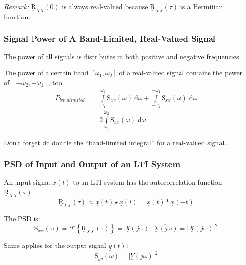 \begin{refsection}
\textit{Remark:} $\underline{\mathrm{R}}_{XX}(0)$ is always real-valued because $\underline{\mathrm{R}}_{XX}(\tau)$ is a Hermitian function.

\subsubsection{Signal Power of A Band-Limited, Real-Valued Signal}

The power of all signals is distributes in both positive and negative frequencies.

The power of a certain band $[\omega_1, \omega_2]$ of a real-valued signal contains the power of $[-\omega_2, -\omega_1]$, too.
\begin{equation}
	\begin{split}
		P_{bandlimited} &= \int\limits_{\omega_1}^{\omega_2} \mathrm{S}_{xx}(\omega) \; \mathrm{d} \omega + \int\limits_{-\omega_2}^{-\omega_1} \mathrm{S}_{xx}(\omega) \; \mathrm{d} \omega \\
		 &= 2 \int\limits_{\omega_1}^{\omega_2} \mathrm{S}_{xx}(\omega) \; \mathrm{d} \omega
	\end{split}
\end{equation}

\begin{attention}
	Don't forget do double the ``band-limited integral'' for a real-valued signal.
\end{attention}

\subsubsection{\acs{PSD} of Input and Output of an \acs{LTI} System}

An input signal $\underline{x}(t)$ to an \ac{LTI} system has the autocorrelation function $\underline{\mathrm{R}}_{XX}(\tau)$.
\begin{equation}
	\underline{\mathrm{R}}_{XX}(\tau) \approx \underline{x}(t) \star \underline{x}(t) = \underline{x}(t) * \overline{\underline{x}(-t)}
\end{equation}

The \ac{PSD} is:
\begin{equation}
	\mathrm{S}_{xx}(\omega) = \mathcal{F}\left\{\underline{\mathrm{R}}_{XX}(\tau)\right\} = \underline{X}\left(j \omega\right) \cdot \overline{\underline{X}\left(j \omega\right)} = \left|\underline{X}\left(j \omega\right)\right|^2
\end{equation}

Same applies for the output signal $\underline{y}(t)$:
\begin{equation}
	\mathrm{S}_{yy}(\omega) = \left|\underline{Y}\left(j \omega\right)\right|^2
\end{equation}


\end{refsection}
